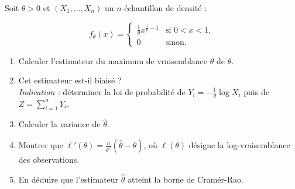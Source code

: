 





























\medskip

\begin{mdframed}
\begin{exercice}
Soit $\theta > 0$ et $(X_1, \dots, X_n)$ un $n$-échantillon de densité :

$$
f_\theta(x) = \begin{cases} 
\frac{1}{\theta} x^{\frac{1}{\theta} - 1} & \text{si } 0 < x < 1, \\ 
0 & \text{sinon.} 
\end{cases} 
$$

\begin{enumerate}
    \item Calculer l'estimateur du maximum de vraisemblance $\hat{\theta}$ de $\theta$.
    \item Cet estimateur est-il biaisé ? \\
    \textit{Indication :} déterminer la loi de probabilité de $Y_i = -\frac{1}{\theta} \log X_i$ puis de $Z = \sum_{i=1}^n Y_i$.
    \item Calculer la variance de $\hat{\theta}$.
    \item Montrer que $\ell'(\theta) = \frac{n}{\theta^2}(\hat{\theta} - \theta)$, où $\ell(\theta)$ désigne la log-vraisemblance des observations.
    \item En déduire que l'estimateur $\hat{\theta}$ atteint la borne de Cramér-Rao.
\end{enumerate}
\end{exercice}
\end{mdframed}

\medskip

